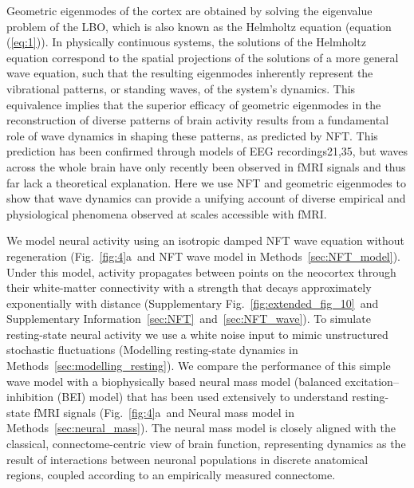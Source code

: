 \documentclass[sn-mathphys-num]{sn-jnl}%
\theoremstyle{thmstyleone}%
\theoremstyle{thmstyletwo}%
\theoremstyle{thmstylethree}%
\begin{document}
Geometric eigenmodes of the cortex are obtained by solving the eigenvalue problem of the LBO, which is also known as the Helmholtz equation (equation (\ref{eq:1})). 
In physically continuous systems, the solutions of the Helmholtz equation correspond to the spatial projections of the solutions of a more general wave equation, such that the resulting eigenmodes inherently represent the vibrational patterns, or standing waves, of the system’s dynamics\cite{levy2006laplace}. 
This equivalence implies that the superior efficacy of geometric eigenmodes in the reconstruction of diverse patterns of brain activity results from a fundamental role of wave dynamics in shaping these patterns, as predicted by NFT. 
This prediction has been confirmed through models of EEG recordings21,35, but waves across the whole brain have only recently been observed in fMRI signals\cite{robinson2005multiscale,bolt2022parsimonious} and thus far lack a theoretical explanation. 
Here we use NFT and geometric eigenmodes to show that wave dynamics can provide a unifying account of diverse empirical and physiological phenomena observed at scales accessible with fMRI.


We model neural activity using an isotropic damped NFT wave equation without regeneration\cite{robinson1997propagation} (Fig.~\ref{fig:4}a~and NFT wave model in Methods~\ref{sec:NFT_model}). 
Under this model, activity propagates between points on the neocortex through their white-matter connectivity with a strength that decays approximately exponentially with distance (Supplementary Fig.~\ref{fig:extended_fig_10}~and Supplementary Information~\ref{sec:NFT}~and~\ref{sec:NFT_wave}). 
To simulate resting-state neural activity we use a white noise input to mimic unstructured stochastic fluctuations\cite{robinson2005multiscale} (Modelling resting-state dynamics in Methods~\ref{sec:modelling_resting}). 
We compare the performance of this simple wave model with a biophysically based neural mass model (balanced excitation–inhibition (BEI) model) that has been used extensively to understand resting-state fMRI signals\cite{deco2014local} (Fig.~\ref{fig:4}a~and Neural mass model in Methods~\ref{sec:neural_mass}). 
The neural mass model is closely aligned with the classical, connectome-centric view of brain function, representing dynamics as the result of interactions between neuronal populations in discrete anatomical regions, coupled according to an empirically measured connectome.
\end{document}
